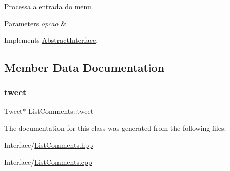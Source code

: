 Processa a entrada do menu. 


\begin{DoxyParams}{Parameters}
{\em opcao} & \\
\hline
\end{DoxyParams}


Implements \hyperlink{class_abstract_interface_acf8223a1da27c6986158836a57fa51ee}{Abstract\+Interface}.



\subsection{Member Data Documentation}
\mbox{\label{class_list_comments_a415809885eccf4beabda6a346a797d7c}} 
\subsubsection{\texorpdfstring{tweet}{tweet}}
{\footnotesize\ttfamily \hyperlink{class_tweet}{Tweet}$\ast$ List\+Comments\+::tweet\hspace{0.3cm}{\ttfamily [private]}}



The documentation for this class was generated from the following files\+:\begin{DoxyCompactItemize}
\item 
Interface/\hyperlink{_list_comments_8hpp}{List\+Comments.\+hpp}\item 
Interface/\hyperlink{_list_comments_8cpp}{List\+Comments.\+cpp}\end{DoxyCompactItemize}
